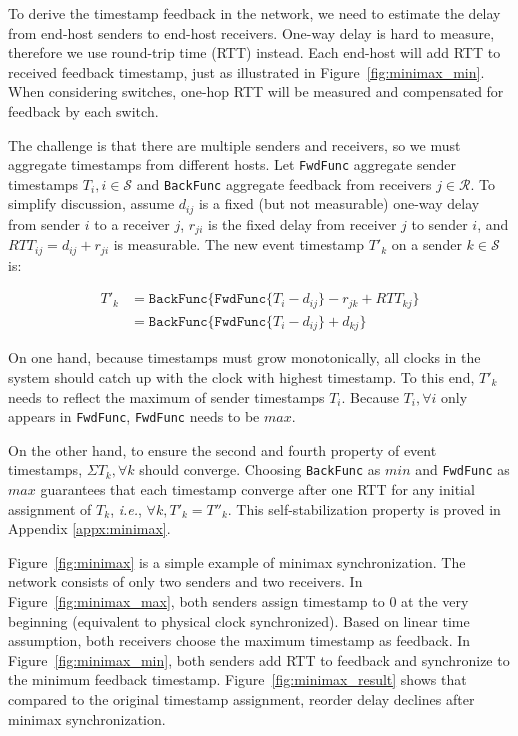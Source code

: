 {\iffalse
To derive the timestamp feedback in the network, we need to estimate the delay from end-host senders to end-host receivers.
One-way delay is hard to measure, therefore we use round-trip time (RTT) instead.
Each end-host will add RTT to received feedback timestamp, just as illustrated in Figure~\ref{fig:minimax_min}.
When considering switches, one-hop RTT will be measured and compensated for feedback by each switch.

The challenge is that there are multiple senders and receivers, so we must aggregate timestamps from different hosts.
Let \texttt{FwdFunc} aggregate sender timestamps $T_i, i \in \mathcal{S}$ and \texttt{BackFunc} aggregate feedback from receivers $j \in \mathcal{R}$.
To simplify discussion, assume $d_{ij}$ is a fixed (but not measurable) one-way delay from sender $i$ to a receiver $j$, $r_{ji}$ is the fixed delay from receiver $j$ to sender $i$, and $RTT_{ij} = d_{ij} + r_{ji}$ is measurable.
The new event timestamp $T'_k$ on a sender $k \in \mathcal{S}$ is:

\begin{equation*}
\begin{aligned}
T'_k & = \texttt{BackFunc} \{ \texttt{FwdFunc} \{ T_i - d_{ij} \} - r_{jk} + RTT_{kj} \} \\
     & = \texttt{BackFunc} \{ \texttt{FwdFunc} \{ T_i - d_{ij} \} + d_{kj} \}
\end{aligned}
\end{equation*}

On one hand, because timestamps must grow monotonically, all clocks in the system should catch up with the clock with highest timestamp.
To this end, $T'_k$ needs to reflect the maximum of sender timestamps $T_i$.
Because $T_i, \forall i$ only appears in \texttt{FwdFunc}, \texttt{FwdFunc} needs to be $max$.

On the other hand, to ensure the second and fourth property of event timestamps, $\Sigma T_k, \forall k$ should converge.
Choosing \texttt{BackFunc} as $min$ and \texttt{FwdFunc} as $max$ guarantees that each timestamp converge after one RTT for any initial assignment of $T_k$, \textit{i.e.}, $\forall k, T'_k = T''_k$.
This self-stabilization property is proved in Appendix \ref{appx:minimax}.

Figure~\ref{fig:minimax} is a simple example of minimax synchronization.
The network consists of only two senders and two receivers.
In Figure~\ref{fig:minimax_max}, both senders assign timestamp to $0$ at the very beginning (equivalent to physical clock synchronized).
Based on linear time assumption, both receivers choose the maximum timestamp as feedback.
In Figure~\ref{fig:minimax_min}, both senders add RTT to feedback and synchronize to the minimum feedback timestamp.
Figure~\ref{fig:minimax_result} shows that compared to the original timestamp assignment, reorder delay declines after minimax synchronization.

}
